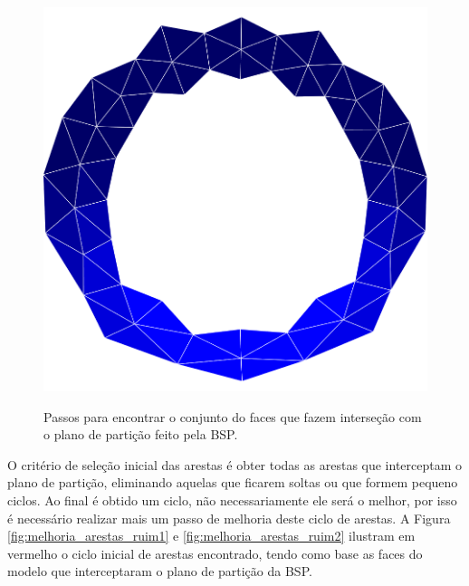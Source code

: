 \begin{figure}[!ht]
{   		\begin{minipage}[c]{0.4\textwidth}{\includegraphics[width=\textwidth]{fig/esfera_simples_anel_faces.png}}\end{minipage}
   	}    
   	\caption{Passos para encontrar o conjunto do faces que fazem interseção com o plano de partição feito pela BSP.}
   	\label{fig:espera_faces}
\end{figure}


O critério de seleção inicial das arestas é obter todas as arestas que interceptam o plano de partição, eliminando aquelas que ficarem soltas ou que formem pequeno ciclos. Ao final é obtido um ciclo, não necessariamente ele será o melhor, por isso é necessário realizar mais um passo de melhoria deste ciclo de arestas. A Figura \ref{fig:melhoria_arestas_ruim1} e \ref{fig:melhoria_arestas_ruim2} ilustram em vermelho o ciclo inicial de arestas encontrado, tendo como base as faces do modelo que interceptaram o plano de partição da BSP.

